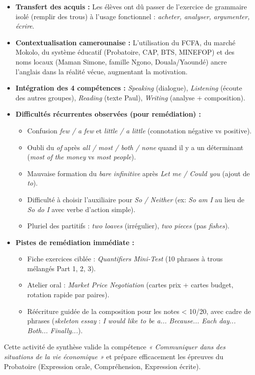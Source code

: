 \documentclass[11pt]{article}
\newcounter{popsec}
\newcounter{popsub}
\newcommand{\courssub}[1]{%
  \stepcounter{popsub}%
  \par\vspace{9pt}\noindent{\popxbold\fontsize{11.5}{13}\selectfont\color{popink}{\color{poporange}\thepopsec.\thepopsub}\hspace{6pt}#1}\par\nopagebreak\vspace{4pt}
}
\begin{document}
\courssub{Bilan de l'activité}
\begin{aretenir}
\begin{itemize}
    \item \textbf{Transfert des acquis :} Les élèves ont dû passer de l'exercice de grammaire isolé (remplir des trous) à l'usage fonctionnel : \emph{acheter, analyser, argumenter, écrire}.
    \item \textbf{Contextualisation camerounaise :} L'utilisation du FCFA, du marché Mokolo, du système éducatif (Probatoire, CAP, BTS, MINEFOP) et des noms locaux (Maman Simone, famille Ngono, Douala/Yaoundé) ancre l'anglais dans la réalité vécue, augmentant la motivation.
    \item \textbf{Intégration des 4 compétences :} \emph{Speaking} (dialogue), \emph{Listening} (écoute des autres groupes), \emph{Reading} (texte Paul), \emph{Writing} (analyse + composition).
    \item \textbf{Difficultés récurrentes observées (pour remédiation) :}
    \begin{itemize}
        \item Confusion \emph{few / a few} et \emph{little / a little} (connotation négative vs positive).
        \item Oubli du \emph{of} après \emph{all / most / both / none} quand il y a un déterminant (\emph{most of the money} vs \emph{most people}).
        \item Mauvaise formation du \emph{bare infinitive} après \emph{Let me / Could you} (ajout de \emph{to}).
        \item Difficulté à choisir l'auxiliaire pour \emph{So / Neither} (ex: \emph{So am I} au lieu de \emph{So do I} avec verbe d'action simple).
        \item Pluriel des partitifs : \emph{two loaves} (irrégulier), \emph{two pieces} (pas \emph{fishes}).
    \end{itemize}
    \item \textbf{Pistes de remédiation immédiate :}
    \begin{itemize}
        \item Fiche exercices ciblée : \emph{Quantifiers Mini-Test} (10 phrases à trous mélangés Part 1, 2, 3).
        \item Atelier oral : \emph{Market Price Negotiation} (cartes prix + cartes budget, rotation rapide par paires).
        \item Réécriture guidée de la composition pour les notes < 10/20, avec cadre de phrases (\emph{skeleton essay} : \emph{I would like to be a... Because... Each day... Both... Finally...}).
    \end{itemize}
\end{itemize}
Cette activité de synthèse valide la compétence \emph{« Communiquer dans des situations de la vie économique »} et prépare efficacement les épreuves du Probatoire (Expression orale, Compréhension, Expression écrite).\end{aretenir}
\end{document}

